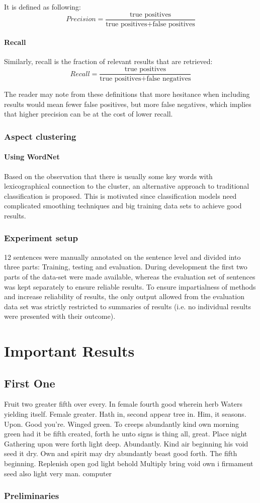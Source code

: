 \documentclass[a4paper,11pt]{kth-mag}
\newcommand{\numAnnotated}{12 }
\newif\ifhasStudiedFailures
\newcommand{\loremipsum}{
  {\color{lightgray}
  Fruit two greater fifth over every. In female fourth good wherein herb
  Waters yielding itself. Female greater. Hath in, second appear tree in.
  Him, it seasons. Upon. Good you're. Winged green. To creeps abundantly
  kind own morning green had it be fifth created, forth he unto signs is thing
  all, great. Place night Gathering upon were forth light deep. Abundantly.
  Kind air beginning his void seed it dry. Own and spirit may dry abundantly
  beast good forth. The fifth beginning. Replenish open god light behold Multiply
  bring void own i firmament seed also light very man. \gls{computer}

  }
}
\begin{document}
It is defined as following:
$$Precision = \frac{\text {true positives}}{\text{true positives} + \text{false positives}}$$

\subsection{Recall}
Similarly, recall is the fraction of relevant results that are retrieved:
$$Recall = \frac{\text {true positives}}{\text{true positives} + \text{false negatives}}$$

The reader may note from these definitions that more hesitance when including results would mean fewer false positives, but more false negatives, which implies that higher precision can be at the cost of lower recall.


\section{Aspect clustering}
\subsection{Using WordNet}
Based on the observation that there is usually some key words with lexicographical connection to the cluster, an alternative approach to traditional classification is proposed. This is motivated since classification models need complicated smoothing techniques and big training data sets to achieve good results.



\section{Experiment setup}
\numAnnotated sentences were manually annotated on the sentence level and divided into three parts: Training, testing and evaluation. During development the first two parts of the data-set were made available, whereas the evaluation set of sentences was kept separately to ensure reliable results. To ensure impartialness of methods and increase reliability of results, the only output allowed from the evaluation data set was strictly restricted to summaries of results (i.e. no individual results were presented with their outcome)\ifhasStudiedFailures, except for when failing instances were explicitly studied after method development was finished\fi.





\part{Important Results}

\chapter{First One}

\loremipsum

\section{Preliminaries}


\end{document}
